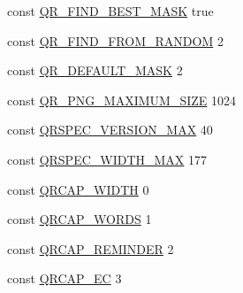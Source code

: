 \begin{DoxyCompactItemize}
\item 
const \hyperlink{phpqrcode_8php_af4ec4aec5be16e8785674055683659e6}{Q\-R\-\_\-\-F\-I\-N\-D\-\_\-\-B\-E\-S\-T\-\_\-\-M\-A\-S\-K} true
\item 
const \hyperlink{phpqrcode_8php_a4a3b50c407bbdf7ffa1197a666947bec}{Q\-R\-\_\-\-F\-I\-N\-D\-\_\-\-F\-R\-O\-M\-\_\-\-R\-A\-N\-D\-O\-M} 2
\item 
const \hyperlink{phpqrcode_8php_ad558bfb85d8139a05d1d663579be938b}{Q\-R\-\_\-\-D\-E\-F\-A\-U\-L\-T\-\_\-\-M\-A\-S\-K} 2
\item 
const \hyperlink{phpqrcode_8php_a45b4274e494e9533fab417bc0aa0eb2a}{Q\-R\-\_\-\-P\-N\-G\-\_\-\-M\-A\-X\-I\-M\-U\-M\-\_\-\-S\-I\-Z\-E} 1024
\item 
const \hyperlink{phpqrcode_8php_a3df227a9148948fa1ee539af90f8a26e}{Q\-R\-S\-P\-E\-C\-\_\-\-V\-E\-R\-S\-I\-O\-N\-\_\-\-M\-A\-X} 40
\item 
const \hyperlink{phpqrcode_8php_a587685a8aaa37d602445f9ba8500daa1}{Q\-R\-S\-P\-E\-C\-\_\-\-W\-I\-D\-T\-H\-\_\-\-M\-A\-X} 177
\item 
const \hyperlink{phpqrcode_8php_a78bf006d34f500b0ba1ae3ba9e31bf0f}{Q\-R\-C\-A\-P\-\_\-\-W\-I\-D\-T\-H} 0
\item 
const \hyperlink{phpqrcode_8php_af5ff4b071ceeb3bdd651ed067ffc4bc8}{Q\-R\-C\-A\-P\-\_\-\-W\-O\-R\-D\-S} 1
\item 
const \hyperlink{phpqrcode_8php_a53c4f9dd4e426f7e95f618a1ffd7b158}{Q\-R\-C\-A\-P\-\_\-\-R\-E\-M\-I\-N\-D\-E\-R} 2
\item 
const \hyperlink{phpqrcode_8php_a80654ddca1dd96ea4774fcf6230dbf2f}{Q\-R\-C\-A\-P\-\_\-\-E\-C} 3
\end{DoxyCompactItemize}


